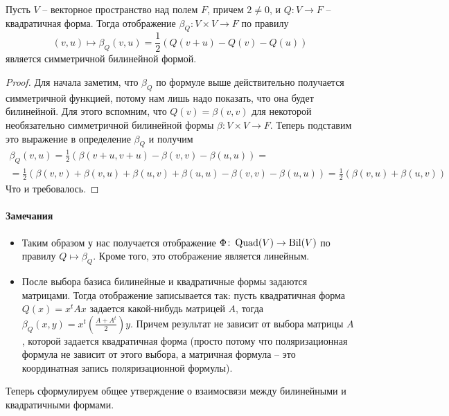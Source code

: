 \begin{claim}
Пусть $V$ -- векторное пространство над полем $F$, причем $2 \neq 0$, и $Q\colon V\to F$ -- квадратичная форма.
Тогда отображение $\beta_Q\colon V\times V\to F$ по правилу 
\[
(v,u)\mapsto \beta_Q(v, u) = \frac{1}{2}\left(Q(v+u) - Q(v) - Q(u)\right)
\]
является симметричной билинейной формой.
\end{claim}
\begin{proof}
Для начала заметим, что $\beta_Q$ по формуле выше действительно получается симметричной функцией, потому нам лишь надо показать, что она будет билинейной.
Для этого вспомним, что $Q(v) = \beta(v, v)$ для некоторой необязательно симметричной билинейной формы $\beta\colon V\times V\to F$.
Теперь подставим это выражение в определение $\beta_Q$ и получим
\begin{gather*}
\beta_Q(v, u) = \frac{1}{2}\left(\beta(v + u, v + u) - \beta(v, v) - \beta(u, u)\right) =\\
= \frac{1}{2}\left(\beta(v,v) + \beta(v, u) + \beta(u, v) + \beta(u,u)- \beta(v, v) - \beta(u, u)\right) = \frac{1}{2}\left(\beta(v, u) + \beta(u, v) \right)
\end{gather*}
Что и требовалось.
\end{proof}

\paragraph{Замечания}

\begin{itemize}
\item Таким образом у нас получается отображение $\Phi\colon\operatorname{Quad}(V) \to \operatorname{Bil}(V)$ по правилу $Q\mapsto \beta_Q$.
Кроме того, это отображение является линейным.

\item После выбора базиса билинейные и квадратичные формы задаются матрицами.
Тогда отображение записывается так: пусть квадратичная форма $Q(x) = x^t A x$ задается какой-нибудь матрицей $A$, тогда $\beta_Q(x, y) = x^t \left(\frac{A + A^t}{2}\right) y$.
Причем результат не зависит от выбора матрицы $A$, которой задается квадратичная форма (просто потому что поляризационная формула не зависит от этого выбора, а матричная формула -- это координатная запись поляризационной формулы).
\end{itemize}


Теперь сформулируем общее утверждение о взаимосвязи между билинейными и квадратичными формами.

